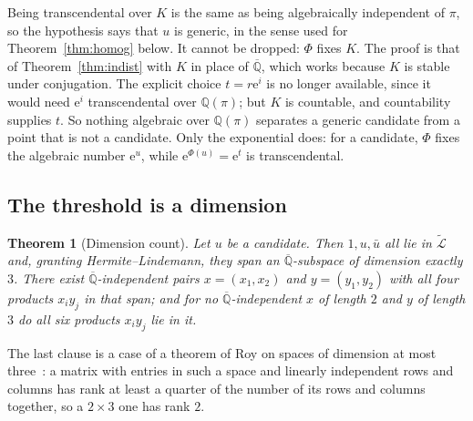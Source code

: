 \documentclass[11pt,a4paper]{article}
\theoremstyle{plain}
\newtheorem{theorem}{Theorem}[section]
\theoremstyle{definition}
\newcommand{\e}{\mathrm{e}}
\newcommand{\Q}{\mathbb{Q}}
\newcommand{\Alg}{\overline{\mathbb{Q}}}
\newcommand{\aLogs}{\widetilde{\mathcal{L}}}
\begin{document}
Being transcendental over $K$ is the same as being algebraically independent of $\pi$, so the
hypothesis says that $u$ is generic, in the sense used for Theorem~\ref{thm:homog} below. It
cannot be dropped: $\Phi$ fixes $K$. The proof is that of Theorem~\ref{thm:indist} with $K$ in place of $\Alg$, which
works because $K$ is stable under conjugation. The explicit choice $t=r\e^{i}$ is no longer
available, since it would need $\e^{i}$ transcendental over $\Q(\pi)$; but $K$ is countable, and
countability supplies $t$. So nothing algebraic over $\Q(\pi)$ separates a generic candidate from
a point that is not a candidate. Only the exponential does: for a candidate, $\Phi$ fixes the
algebraic number $\e^{u}$, while $\e^{\Phi(u)}=\e^{t}$ is transcendental.

\subsection*{The threshold is a dimension}

\begin{theorem}[Dimension count]\label{thm:dim}
Let $u$ be a candidate. Then $1,u,\bar u$ all lie in $\aLogs$ and, granting
Hermite--Lindemann, they span an $\Alg$-subspace of dimension exactly $3$. There exist
$\Alg$-independent pairs $x=(x_{1},x_{2})$ and $y=(y_{1},y_{2})$ with all four products
$x_{i}y_{j}$ in that span; and for no $\Alg$-independent $x$ of length $2$ and $y$ of length $3$
do all six products $x_{i}y_{j}$ lie in it.
\end{theorem}

The last clause is a case of a theorem of Roy on spaces of dimension at most
three~\cite[Lemma~12.16 and Exercise~12.10]{waldschmidt-book}: a matrix with entries in such a space
and linearly independent rows and columns has rank at least a quarter of the number of its rows and
columns together, so a $2\times3$ one has rank $2$.
\end{document}

